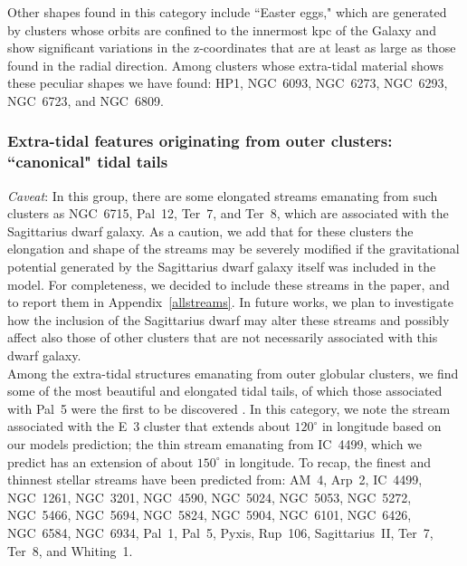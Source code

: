             Other shapes found in this category include ``Easter eggs," which are generated by clusters whose orbits are confined to the innermost kpc of the Galaxy and show significant variations in the z-coordinates that are at least as large as those found in the radial direction. Among clusters whose extra-tidal material shows these peculiar shapes we have found: HP1, NGC~6093, NGC~6273, NGC~6293, NGC~6723, and NGC~6809.

        \subsubsection{Extra-tidal features originating from outer clusters: ``canonical" tidal tails}

            \textit{Caveat}: In this group, there are some elongated streams emanating from such clusters as NGC~6715, Pal~12, Ter~7, and Ter~8, which are  associated with the Sagittarius dwarf galaxy. As a caution, we add that for these clusters the elongation and shape of the streams may be severely modified if the gravitational potential generated by the Sagittarius dwarf galaxy itself was included in the model. For completeness, we decided to include these streams in the paper, and to report them in Appendix~\ref{allstreams}. In future works, we plan to investigate how the inclusion of the Sagittarius dwarf may alter these streams and possibly affect also those of other clusters that are not necessarily associated with this dwarf galaxy.\\

            Among the extra-tidal structures emanating from outer globular clusters, we find some of the most beautiful and elongated tidal tails, of which those associated with Pal~5 were the first to be discovered \citep{odenkirchen01}.  In this category, we note the stream associated with the E~3 cluster that extends about  $120^\circ$  in longitude based on our models prediction; the thin stream emanating from IC~4499, which we predict has an extension of about $150^\circ$ in longitude.  To recap, the finest and thinnest stellar streams have been predicted from: AM~4, Arp~2, IC~4499, NGC~1261, NGC~3201, NGC~4590, NGC~5024, NGC~5053, NGC~5272, NGC~5466, NGC~5694, NGC~5824, NGC~5904, NGC~6101, NGC~6426, NGC~6584, NGC~6934, Pal~1, Pal~5, Pyxis, Rup~106, Sagittarius~II, Ter~7, Ter~8, and Whiting~1.

